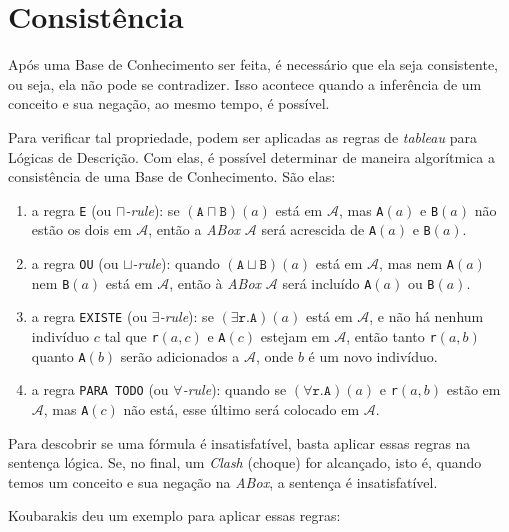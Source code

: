 \section{Consistência}

Após uma Base de Conhecimento ser feita, é necessário que ela seja consistente, ou seja, ela não pode se contradizer. Isso acontece quando a inferência de um conceito e sua negação, ao mesmo tempo, é possível. 

Para verificar tal propriedade, podem ser aplicadas as regras de \textit{tableau} para Lógicas de Descrição. Com elas, é possível determinar de maneira algorítmica a consistência de uma Base de Conhecimento. São elas:

\begin{enumerate}
	\item a regra \texttt{E} (ou \textit{$ \sqcap $-rule}): se $(\texttt{A} \sqcap \texttt{B})(a)$ está em $ \mathcal{A} $, mas \texttt{A}$ (a) $ e \texttt{B}$ (a) $ não estão os dois em $ \mathcal{A} $, então a \textit{ABox} $ \mathcal{A} $ será acrescida de \texttt{A}$ (a) $ e \texttt{B}$ (a) $.
	\item a regra \texttt{OU} (ou \textit{$ \sqcup $-rule}): quando $(\texttt{A} \sqcup \texttt{B})(a)$ está em $ \mathcal{A} $, mas nem \texttt{A}$ (a) $ nem \texttt{B}$ (a) $ está em $ \mathcal{A} $, então à \textit{ABox} $ \mathcal{A} $ será incluído \texttt{A}$ (a) $ ou \texttt{B}$ (a) $.
	\item a regra \texttt{EXISTE} (ou \textit{$ \exists $-rule}): se $(\exists \texttt{r.A})(a)$ está em $ \mathcal{A} $, e não há nenhum indivíduo $ c $ tal que \texttt{r}$ (a,c) $ e \texttt{A}$ (c) $ estejam em $ \mathcal{A} $, então tanto \texttt{r}$ (a,b) $ quanto \texttt{A}$ (b) $ serão adicionados a $ \mathcal{A} $, onde $ b $ é um novo indivíduo.
	\item a regra \texttt{PARA TODO} (ou \textit{$ \forall $-rule}): quando se $(\forall \texttt{r.A})(a)$ e \texttt{r}$ (a,b) $ estão em $ \mathcal{A} $, mas \texttt{A}$ (c) $ não está, esse último será colocado em $ \mathcal{A} $.  
\end{enumerate}

Para descobrir se uma fórmula é insatisfatível, basta aplicar essas regras na sentença lógica. Se, no final, um \textit{Clash} (choque) for alcançado, isto é, quando temos um conceito e sua negação na \textit{ABox}, a sentença é insatisfatível.

Koubarakis \cite{logicaKoubarakis} deu um exemplo para aplicar essas regras:

